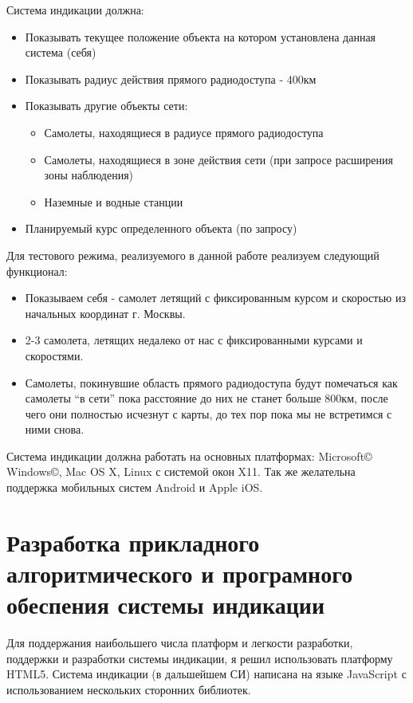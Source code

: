 \documentclass[a4paper,12pt]{report} %
\begin{document}
Система индикации должна:
\begin{itemize}
\item Показывать текущее положение объекта на котором установлена данная система
  (себя)
\item Показывать радиус действия прямого радиодоступа - 400км
\item Показывать другие объекты сети:
\begin{itemize}
  \item Самолеты, находящиеся в радиусе прямого радиодоступа
\item Самолеты, находящиеся в зоне действия сети (при запросе расширения зоны
  наблюдения)
\item Наземные и водные станции
\end{itemize}
\item Планируемый курс определенного объекта (по запросу)
\end{itemize}

Для тестового режима, реализуемого в данной работе реализуем следующий
функционал:
\begin{itemize}
\item Показываем себя - самолет летящий с фиксированным курсом и скоростью из
  начальных координат г. Москвы.
\item 2-3 самолета, летящих недалеко от нас с фиксированными курсами и
  скоростями.
\item Самолеты, покинувшие область прямого радиодоступа будут помечаться как
  самолеты ``в сети'' пока расстояние до них не станет больше 800км, после чего
  они полностью исчезнут с карты, до тех пор пока мы не встретимся с ними снова.
\end{itemize}

Система индикации должна работать на основных платформах: Microsoft\copyright
Windows\copyright, Mac OS X, Linux с системой окон X11. Так же желательна
поддержка мобильных систем Android и Apple iOS.
\newpage

\section{Разработка прикладного алгоритмического и \newline програмного
  обеспения  системы индикации} %
Для поддержания наибольшего числа платформ и легкости разработки, поддержки и
разработки системы индикации, я решил использовать платформу HTML5. Система
индикации (в дальшейшем СИ) написана на языке JavaScript с использованием
нескольких сторонних библиотек.
\end{document}
